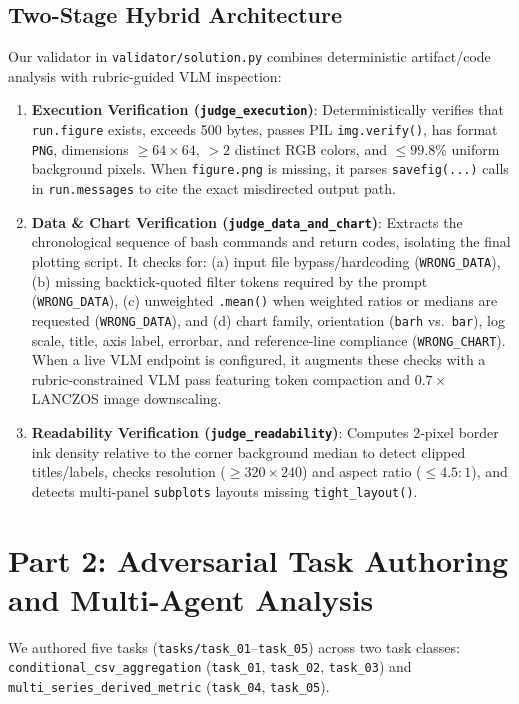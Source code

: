 \documentclass[11pt]{article}
\begin{document}
\subsection{Two-Stage Hybrid Architecture}
Our validator in \texttt{validator/solution.py} combines deterministic artifact/code analysis with rubric-guided VLM inspection:
\begin{enumerate}
    \item \textbf{Execution Verification (\texttt{judge\_execution})}: Deterministically verifies that \texttt{run.figure} exists, exceeds 500 bytes, passes PIL \texttt{img.verify()}, has format \texttt{PNG}, dimensions $\ge 64\times 64$, $>2$ distinct RGB colors, and $\le 99.8\%$ uniform background pixels. When \texttt{figure.png} is missing, it parses \texttt{savefig(...)} calls in \texttt{run.messages} to cite the exact misdirected output path.
    \item \textbf{Data \& Chart Verification (\texttt{judge\_data\_and\_chart})}: Extracts the chronological sequence of bash commands and return codes, isolating the final plotting script. It checks for: (a) input file bypass/hardcoding (\texttt{WRONG\_DATA}), (b) missing backtick-quoted filter tokens required by the prompt (\texttt{WRONG\_DATA}), (c) unweighted \texttt{.mean()} when weighted ratios or medians are requested (\texttt{WRONG\_DATA}), and (d) chart family, orientation (\texttt{barh} vs.\ \texttt{bar}), log scale, title, axis label, errorbar, and reference-line compliance (\texttt{WRONG\_CHART}). When a live VLM endpoint is configured, it augments these checks with a rubric-constrained VLM pass featuring token compaction and $0.7\times$ LANCZOS image downscaling.
    \item \textbf{Readability Verification (\texttt{judge\_readability})}: Computes 2-pixel border ink density relative to the corner background median to detect clipped titles/labels, checks resolution ($\ge 320\times 240$) and aspect ratio ($\le 4.5:1$), and detects multi-panel \texttt{subplots} layouts missing \texttt{tight\_layout()}.
\end{enumerate}

\section{Part 2: Adversarial Task Authoring and Multi-Agent Analysis}

We authored five tasks (\texttt{tasks/task\_01}--\texttt{task\_05}) across two task classes: \texttt{conditional\_csv\_aggregation} (\texttt{task\_01}, \texttt{task\_02}, \texttt{task\_03}) and \texttt{multi\_series\_derived\_metric} (\texttt{task\_04}, \texttt{task\_05}).
\end{document}
